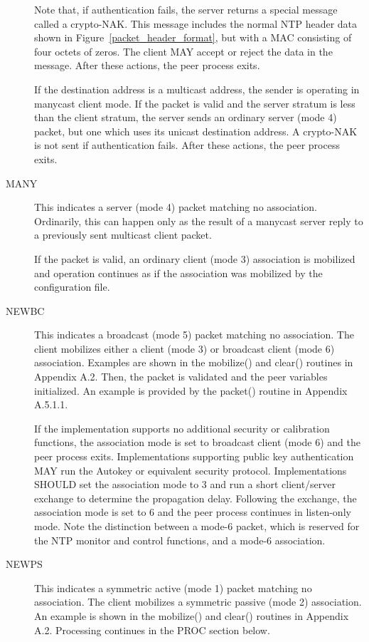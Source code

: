 \begin{description}
    Note that, if authentication fails, the server returns a special
    message called a crypto-NAK. This message includes the normal NTP
    header data shown in Figure~\ref{packet_header_format}, but with a MAC consisting of four
    octets of zeros. The client MAY accept or reject the data in the
    message. After these actions, the peer process exits.

    If the destination address is a multicast address, the sender is
    operating in manycast client mode. If the packet is valid and the
    server stratum is less than the client stratum, the server sends an
    ordinary server (mode 4) packet, but one which uses its unicast
    destination address. A crypto-NAK is not sent if authentication
    fails. After these actions, the peer process exits.

  \item[MANY] This indicates a server (mode 4) packet matching no
    association. Ordinarily, this can happen only as the result of a
    manycast server reply to a previously sent multicast client packet.

    If the packet is valid, an ordinary client (mode 3) association is
    mobilized and operation continues as if the association was mobilized
    by the configuration file.

  \item[NEWBC] This indicates a broadcast (mode 5) packet matching no
    association. The client mobilizes either a client (mode 3) or
    broadcast client (mode 6) association. Examples are shown in the
    mobilize() and clear() routines in Appendix A.2. Then, the packet is
    validated and the peer variables initialized. An example is provided
    by the packet() routine in Appendix A.5.1.1.

    If the implementation supports no additional security or calibration
    functions, the association mode is set to broadcast client (mode 6)
    and the peer process exits. Implementations supporting public key
    authentication MAY run the Autokey or equivalent security protocol.
    Implementations SHOULD set the association mode to 3 and run a short
    client/server exchange to determine the propagation delay. Following
    the exchange, the association mode is set to 6 and the peer process
    continues in listen-only mode. Note the distinction between a mode-6
    packet, which is reserved for the NTP monitor and control functions,
    and a mode-6 association.

  \item[NEWPS] This indicates a symmetric active (mode 1) packet matching no
    association. The client mobilizes a symmetric passive (mode 2)
    association. An example is shown in the mobilize() and clear()
    routines in Appendix A.2. Processing continues in the PROC section
    below.


\end{description}
